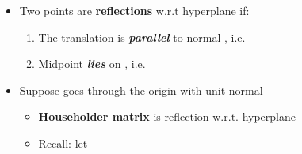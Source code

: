 \begin{itemize}

      \item
            Two points  are
            \textbf{reflections} w.r.t hyperplane
             if:

            \begin{enumerate}
                  \def\labelenumi{\arabic{enumi})}

                  \item
                        The translation
                        is \textbf{\emph{parallel}} to normal ,
                        i.e. 
                  \item
                        Midpoint 
                        \textbf{\emph{lies}} on ,
                        i.e. 
            \end{enumerate}
      \item
            Suppose
            goes through the origin with unit normal 

            \begin{itemize}

                  \item
                        \textbf{Householder matrix}
                        is reflection w.r.t. hyperplane 
                  \item
                        Recall: let

                        \begin{itemize}


\end{itemize}
\end{itemize}
\end{itemize}
